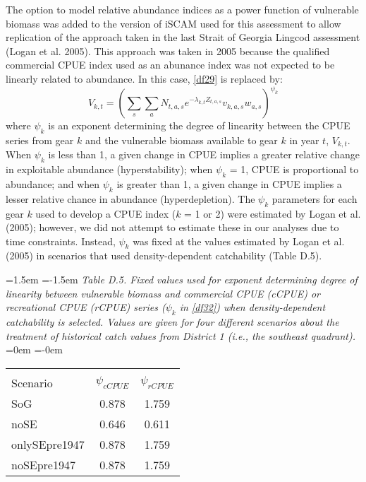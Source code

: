 \documentclass[11pt]{article}   %
\def\AppLet{D}                   %
\def\vsd{\vspace*{1ex}}     %
\begin{document}
The option to model relative abundance indices as a power function of vulnerable biomass was added to the version of iSCAM used for this assessment to allow replication of the approach taken in the last Strait of Georgia Lingcod assessment (Logan et al. 2005).  This approach was taken in 2005 because the qualified commercial CPUE index used as an abunance index was not expected to be linearly related to abundance.  In this case, \eqref{df29} is replaced by:      
\begin{equation}\label{df32}
 V_{k,t} = (\sum_s \sum_a N_{t,a,s} e^{-\lambda_{k,t} Z_{t,a,s}} v_{k,a,s} w_{a,s})^{\psi_k}
\end{equation}
where $\psi_k$ is an exponent determining the degree of linearity between the CPUE series from gear $k$ and the vulnerable biomass available to gear $k$ in year $t$, $V_{k,t}$.  When $\psi_k$ is less than 1, a given change in CPUE implies a greater relative change in exploitable abundance (hyperstability); when $\psi_k$ = 1, CPUE is proportional to abundance; and when $\psi_k$ is greater than 1, a given change in CPUE implies a lesser relative chance in abundance (hyperdepletion).  The $\psi_k$ parameters for each gear $k$ used to develop a CPUE index ($k$ = 1 or 2) were estimated by Logan et al. (2005); however, we did not attempt to estimate these in our analyses due to time constraints.  Instead, $\psi_k$ was fixed at the values estimated by Logan et al. (2005) in scenarios that used density-dependent catchability (Table \AppLet.5).        


\begin{table}[tp]
\leftskip=1.5em
\parindent=-1.5em
{\it Table \AppLet.5. Fixed values used for exponent determining degree of linearity between vulnerable biomass and commercial CPUE (cCPUE) or recreational CPUE (rCPUE) series ($\psi_k$  in \eqref{df32}) when density-dependent catchability is selected.  Values are given for four different scenarios about the treatment of historical catch values from District 1 (i.e., the southeast quadrant).  }
\leftskip=0em
\parindent=-0em
\begin{center}
\begin{tabular}{lcc} 
\hline \\[-1.5ex]
Scenario   &   $\psi_{cCPUE}$       &    $\psi_{rCPUE}$   \\ 
\hline %
SoG & 0.878 & 1.759 \\
noSE & 0.646 & 0.611 \\
onlySEpre1947 & 0.878 & 1.759 \\
noSEpre1947 & 0.878 & 1.759 \\
\hline 
\end{tabular} 
\vsd
\end{center}
\end{table}
\end{document}
